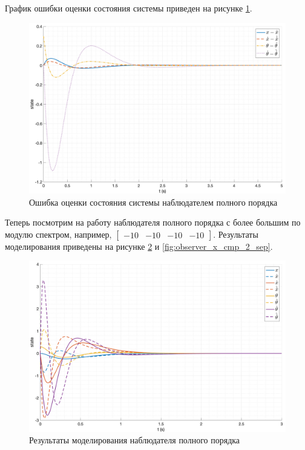 График ошибки оценки состояния системы приведен на рисунке \ref{fig:observer_err_1}.
\begin{figure}[ht!]
    \centering
    \includegraphics[width=\textwidth]{media/plots/modal_observer/observer_err_1.png}
    \caption{Ошибка оценки состояния системы наблюдателем полного порядка}
    \label{fig:observer_err_1}
\end{figure} 

Теперь посмотрим на работу наблюдателя полного порядка с более большим по модулю спектром, например, 
$\begin{bmatrix}-10 & -10 & -10 & -10\end{bmatrix}$. Результаты моделирования приведены на
рисунке \ref{fig:observer_x_2} и \ref{fig:observer_x_cmp_2_sep}. 
\begin{figure}[ht!]
    \centering
    \includegraphics[width=\textwidth]{media/plots/modal_observer/observer_cmp_2.png}
    \caption{Результаты моделирования наблюдателя полного порядка}
    \label{fig:observer_x_2}
\end{figure}


